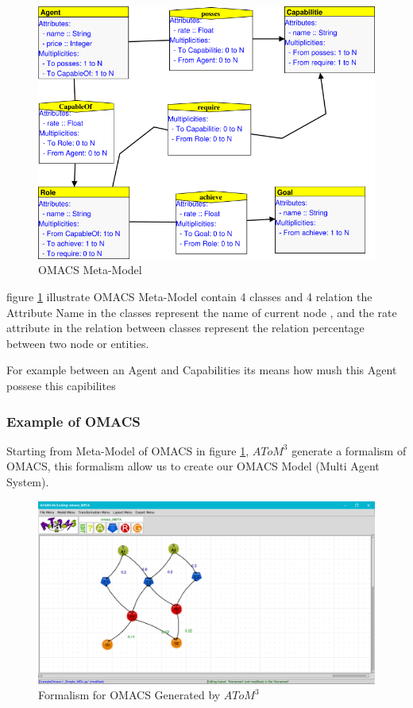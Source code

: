 \begin{figure}[th]
	\centering
 	\includegraphics[scale=0.7]{ch3/img/omacs_meta}
	\caption{\label{fig:OMACS Meta-Model}OMACS Meta-Model}
\end{figure} 
\vspace{0.9cm}
figure \ref{fig:OMACS Meta-Model} illustrate OMACS Meta-Model  contain 4 classes 
and 4 relation   
the Attribute Name in the classes represent the name of current node ,
and the rate attribute in the relation between classes represent  the relation percentage between two node or entities.

For example between an Agent and Capabilities its means how mush this Agent possese this capibilites
\pagebreak
\subsubsection{Example of OMACS}

Starting from  Meta-Model of OMACS in figure  \ref{fig:OMACS Meta-Model}, $AToM^3$ generate a formalism of OMACS, this formalism allow us to create our OMACS Model (Multi Agent System).
\vspace{0.1cm}
\begin{figure}[th]
	\centering
 	\includegraphics[scale=0.3]{ch3/img/omacs_model}
	\caption{\label{fig:OMACS Model}Formalism for OMACS Generated by $AToM^3$ }
\end{figure} 

